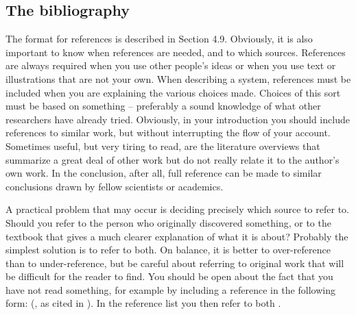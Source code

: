 \subsection{The bibliography}\label{sec:_the_bibliography}
The format for references is described in Section 4.9.
Obviously, it is also important to know when references are needed, and to which sources.
References are always required when you use other people’s ideas or when you use text or illustrations that are not your own.
When describing a system, references must be included when you are explaining the various choices made.
Choices of this sort must be based on something – preferably a sound knowledge of what other researchers have already tried.
Obviously, in your introduction you should include references to similar work, but without interrupting the flow of your account.
Sometimes useful, but very tiring to read, are the literature overviews that summarize a great deal of other work but do not really relate it to the author’s own work.
In the conclusion, after all, full reference can be made to similar conclusions drawn by fellow scientists or academics.

A practical problem that may occur is deciding precisely which source to refer to.
Should you refer to the person who originally discovered something, or to the textbook that gives a much clearer explanation of what it is about? Probably the simplest solution is to refer to both.
On balance, it is better to over-reference than to under-reference, but be careful about referring to original work that will be difficult for the reader to find.
You should be open about the fact that you have not read something, for example by including a reference in the following form: (\citealp{schwartz97}, as cited in \citealp{berrah99}).
In the reference list you then refer to both \citetext{\citeauthor{schwartz97}, without the cited bit, and \citeauthor{berrah99}}.

